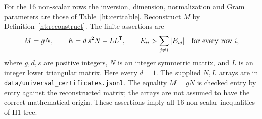 \begin{htlem}\label{ht:matrixcert}
For the 16 non-scalar rows the inversion, dimension, normalization and
Gram parameters are those of Table~\ref{ht:certtable}. Reconstruct
\(M\) by Definition~\ref{ht:reconstruct}. The finite assertions are
\begin{equation}\label{ht:gramchecks}
 M=gN,\qquad
 E=d\,s^2N-LL^{\mathsf T},\qquad
 E_{ii}>\sum_{j\ne i}|E_{ij}|\quad\hbox{for every row }i,
\end{equation}
where \(g,d,s\) are positive integers, \(N\) is an integer symmetric
matrix, and \(L\) is an integer lower triangular matrix. Here every
\(d=1\). The supplied \(N,L\) arrays are in
\texttt{data/\allowbreak universal\_certificates.jsonl}. The equality \(M=gN\) is
checked entry by entry against the reconstructed matrix; the arrays
are not assumed to have the correct mathematical origin.
These assertions imply all 16 non-scalar inequalities of H1-tree.
\end{htlem}

